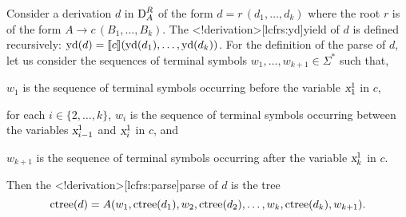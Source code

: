 \documentclass[../document.tex]{subfiles}
\begin{document}
    \begin{definition}
        Consider a derivation \(d\) in \(\operatorname{D}^R_A\) of the form \(d = r\,(d_1, \ldots, d_k)\) where the root \(r\) is of the form \(A \to c\,(B_1, \ldots, B_k)\).
        The <\lcfrs!derivation>[lcfrs:yd]{yield} of \(d\) is defined recursively: \(\operatorname{yd}(d) = \llbracket c\rrbracket(\operatorname{yd}(d_1), \ldots, \operatorname{yd}(d_k))\).
        For the definition of the parse of \(d\), let us consider the sequences of terminal symbols \(w_1, \ldots, w_{k+1} \in \varSigma^*\) such that,
        \begin{compactitem}
            \item \(w_1\) is the sequence of terminal symbols occurring before the variable \(\textsl{x}_1^1\) in \(c\),
            \item for each \(i \in \{2, \ldots, k\}\), \(w_i\) is the sequence of terminal symbols occurring between the variables \(\textsl{x}_{i-1}^1\) and \(\textsl{x}_i^1\) in \(c\), and
            \item \(w_{k+1}\) is the sequence of terminal symbols occurring after the variable \(\textsl{x}_k^1\) in \(c\).
        \end{compactitem}
        Then the <\lcfrs!derivation>[lcfrs:parse]{parse} of \(d\) is the tree \[
            \operatorname{ctree}(d) = A(w_1, \operatorname{ctree}(d_1), w_2, \operatorname{ctree}(d_2), \ldots, w_k, \operatorname{ctree}(d_k), w_{k+1}) \text{.}
        \]
    \end{definition}
\end{document}
